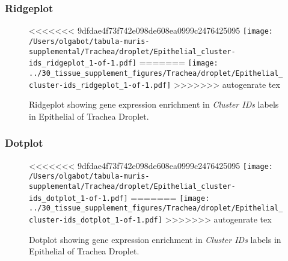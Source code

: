 \clearpage

\subsubsection{Ridgeplot}
\begin{figure}[h]
\centering
<<<<<<< 9dfdae4f73f742e098de608ea0999c2476425095
\texttt{[image: /Users/olgabot/tabula-muris-supplemental/Trachea/droplet/Epithelial\_cluster-ids\_ridgeplot\_1-of-1.pdf]}
=======
\texttt{[image: ../30\_tissue\_supplement\_figures/Trachea/droplet/Epithelial\_cluster-ids\_ridgeplot\_1-of-1.pdf]}
>>>>>>> autogenrate tex

\caption{ Ridgeplot  showing gene expression enrichment in \emph{Cluster IDs} labels in Epithelial of Trachea Droplet. }
\end{figure}


\clearpage

\subsubsection{Dotplot}
\begin{figure}[h]
\centering
<<<<<<< 9dfdae4f73f742e098de608ea0999c2476425095
\texttt{[image: /Users/olgabot/tabula-muris-supplemental/Trachea/droplet/Epithelial\_cluster-ids\_dotplot\_1-of-1.pdf]}
=======
\texttt{[image: ../30\_tissue\_supplement\_figures/Trachea/droplet/Epithelial\_cluster-ids\_dotplot\_1-of-1.pdf]}
>>>>>>> autogenrate tex

\caption{ Dotplot  showing gene expression enrichment in \emph{Cluster IDs} labels in Epithelial of Trachea Droplet. }
\end{figure}

